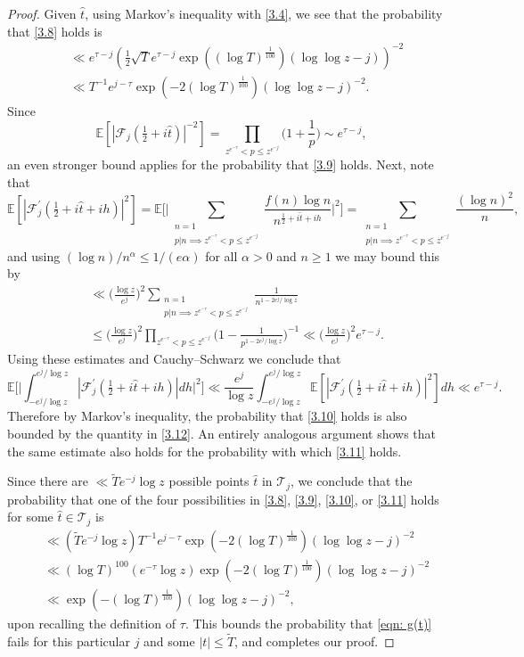 \documentclass[12pt, notitlepage]{amsart}
\numberwithin{equation}{section}
\def\E{\mathbb E}
\def\TT{\widetilde{T}}
\theoremstyle{remark}
\theoremstyle{definition}
\theoremstyle{remark}
\numberwithin{equation}{section}
\begin{document}
\begin{proof}
Given ${\widehat t}$, using Markov's inequality with \eqref{3.4}, we see that the probability that \eqref{3.8} holds is
\begin{align} 
\label{3.12} 
&\ll e^{\tau-j} (\tfrac 12 \sqrt{T} e^{\tau-j} \exp((\log T)^{\frac 1{100}}) (\log \log z - j))^{-2} \nonumber\\
& \ll T^{-1} e^{j-\tau} \exp(-2(\log T)^{\frac 1{100}}) (\log \log z - j)^{-2}.
\end{align} 
Since 
$$
\E[|{\mathcal F}_j(\tfrac 12+i {\widehat t})|^{-2}] = \prod_{z^{e^{-\tau}} < p \le z^{e^{-j}}} \Big(1 +\frac 1p \Big) \sim e^{\tau -j}, 
$$ 
an even stronger bound applies for the probability that \eqref{3.9} holds.   Next, note that 
$$ 
\E[ |{\mathcal F}_j^{\prime}(\tfrac 12 +i{\widehat t} +ih)|^2 ] = \E\Big[ \Big| \sum_{\substack{ n=1 \\ p|n \implies z^{e^{-\tau}}<p\le z^{e^{-j}}}} \frac{f(n) \log n}{n^{\frac 12+i {\widehat t}+ih}}\Big|^2\Big] = \sum_{\substack{ n=1 \\ p|n \implies z^{e^{-\tau}}<p\le z^{e^{-j}}}} \frac{(\log n)^2}{n},  
$$ 
and using $(\log n)/n^{\alpha} \le 1/(e\alpha)$ for all $\alpha>0$ and $n\ge 1$ we may bound this by 
\begin{align*} 
&\ll \Big( \frac{\log z}{e^j} \Big)^2 \sum_{\substack{ n=1 \\ p|n \implies z^{e^{-\tau}}<p\le z^{e^{-j}}}} \frac{1}{n^{1-2 e^{j}/\log z}} 
\\
&\le \Big( \frac{\log z}{e^j} \Big)^2  \prod_{z^{e^{-\tau}}<p\le z^{e^{-j}}} \Big(1- \frac 1{p^{1-2e^{j}/\log z}}\Big)^{-1} \ll \Big( \frac{\log z}{e^j} \Big)^2 e^{\tau-j}. 
\end{align*} 
Using these estimates and Cauchy--Schwarz we conclude that 
$$ 
\E \Big[ \Big| \int_{-e^{j}/\log z}^{e^{j}/\log z} |{\mathcal F}_j^{\prime}(\tfrac 12+i{\widehat t} +ih)| dh \Big|^2 \Big] 
\ll \frac{e^{j}}{\log z} \int_{-e^{j}/\log z}^{e^{j}/\log z}  \E[ |{\mathcal F}_j^{\prime}(\tfrac 12 +i{\widehat t} +ih)|^2 ]  dh \ll e^{\tau- j}. 
$$ 
Therefore by Markov's inequality, the probability that \eqref{3.10} holds is also bounded by the quantity in \eqref{3.12}.   An entirely analogous argument shows that the same estimate also holds for the probability with which \eqref{3.11} holds.   

Since there are $\ll {\widetilde T}e^{-j} \log z$ possible points ${\widehat t}$ in ${\mathcal T}_j$, we conclude that the probability that one of the four possibilities in \eqref{3.8}, 
\eqref{3.9},  \eqref{3.10}, or \eqref{3.11} holds for some ${\widehat t} \in {\mathcal T}_j$ is 
\begin{align*}
&\ll ({\widetilde T} e^{-j} \log z) T^{-1} e^{j-\tau} \exp(-2(\log T)^{\frac 1{100}}) (\log \log z - j)^{-2}\\
& \ll (\log T)^{100} (e^{-\tau} \log z) \exp(-2(\log T)^{\frac 1{100}}) (\log \log z - j)^{-2} \\
&\ll \exp(-(\log T)^{\frac 1{100}}) (\log \log z - j)^{-2}, 
\end{align*}
upon recalling the definition of $\tau$.   This bounds the probability that \eqref{eqn: g(t)} fails for this particular $j$ and some $|t| \le \TT$, and completes our proof. 
 \end{proof} 
\end{document}
